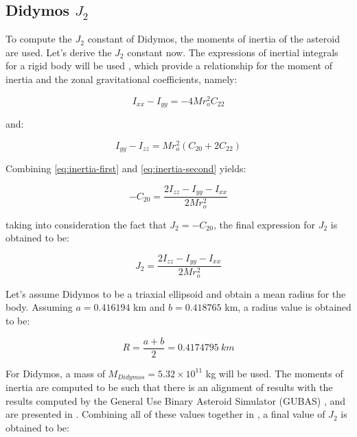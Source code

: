\subsection{Didymos $J_{2}$}

To compute the $J_{2}$ constant of Didymos, the moments of inertia of the asteroid are used. Let's derive the $J_{2}$ constant now. The expressions of inertial integrals for a rigid body will be used \cite{scheeres}, which provide a relationship for the moment of inertia and the zonal gravitational coefficients, namely:

\begin{equation}
	\label{eq:inertia-first}
	I_{xx} - I_{yy} = -4Mr_{o}^{2}C_{22}
\end{equation}

and:

\begin{equation}
	\label{eq:inertia-second}
	I_{yy} - I_{zz} = Mr_{o}^{2} (C_{20} + 2C_{22})
\end{equation}

Combining \cref{eq:inertia-first} and \cref{eq:inertia-second} yields:

\begin{equation}
	\label{eq:inertia-c20}
	-C_{20} = \frac{2I_{zz}-I_{yy}-I_{xx}}{2Mr_{o}^{2}}
\end{equation}

taking into consideration the fact that $J_{2}=-C_{20}$, the final expression for $J_{2}$ is obtained to be:

\begin{equation}
	\label{eq:inertia-j2}
	J_{2} = \frac{2I_{zz}-I_{yy}-I_{xx}}{2Mr_{o}^{2}}
\end{equation}

Let's assume Didymos to be a triaxial ellipsoid and obtain a mean radius for the body. Assuming $a=0.416194$ \si{\kilo\meter} and $b=0.418765$ \si{\kilo\meter}, a radius value is obtained to be:

\begin{equation}
	R=\frac{a+b}{2}=0.4174795\ km
\end{equation}

For Didymos, a mass of $M_{Didymos}=5.32\times10^{11}$ \si{\kilogram} will be used. The moments of inertia are computed to be such that there is an alignment of results with the results computed by the General Use Binary Asteroid Simulator (GUBAS) \cite{gubas}, and are presented in . Combining all of these values together in , a final value of $J_{2}$ is obtained to be:

